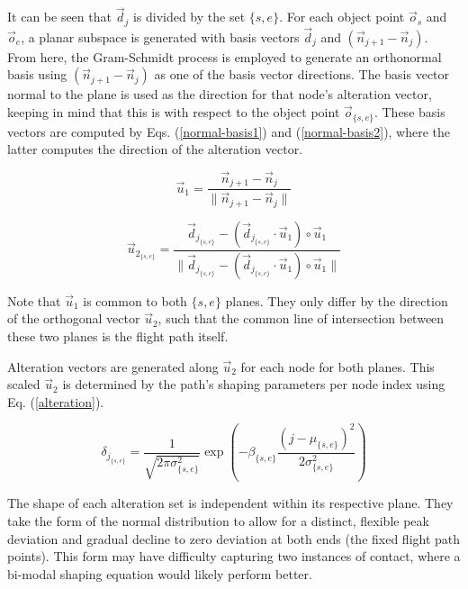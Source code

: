 \documentclass[conf]{new-aiaa}
\begin{document}
It can be seen that $\vec{d}_j$ is divided by the set $\{s, e\}$. For each object point $\vec{o}_s$ and $\vec{o}_e$, a planar subspace is generated with basis vectors $\vec{d}_j$ and $(\vec{n}_{j + 1} - \vec{n}_j)$. From here, the Gram-Schmidt process is employed to generate an orthonormal basis using $(\vec{n}_{j + 1} - \vec{n}_j)$ as one of the basis vector directions. The basis vector normal to the plane is used as the direction for that node's alteration vector, keeping in mind that this is with respect to the object point $\vec{o}_{\{s, e\}}$. These basis vectors are computed by Eqs. (\ref{normal-basis1}) and (\ref{normal-basis2}), where the latter computes the direction of the alteration vector.

\begin{equation}
\label{normal-basis1}
\vec{u}_1 = \frac{\vec{n}_{j + 1} - \vec{n}_j}{\|\vec{n}_{j + 1} - \vec{n}_j\|}
\end{equation}

\begin{equation}
\label{normal-basis2}
\vec{u}_{2_{\{s, e\}}} = \frac{\vec{d}_{j_{\{s, e\}}} - \left(\vec{d}_{j_{\{s, e\}}}{\cdot}\vec{u}_1\right){\circ}\vec{u}_1}{\|\vec{d}_{j_{\{s, e\}}} - \left(\vec{d}_{j_{\{s, e\}}}{\cdot}\vec{u}_1\right){\circ}\vec{u}_1\|}
\end{equation}

Note that $\vec{u}_1$ is common to both $\{s, e\}$ planes. They only differ by the direction of the orthogonal vector $\vec{u}_2$, such that the common line of intersection between these two planes is the flight path itself.

Alteration vectors are generated along $\vec{u}_2$ for each node for both planes. This scaled $\vec{u}_2$ is determined by the path's shaping parameters per node index using Eq. (\ref{alteration}).

\begin{equation}
\label{alteration}
\delta_{j_{\{s, e\}}} = \frac{1}{\sqrt{2\pi\sigma_{\{s, e\}}^2}}\exp\left({-\beta_{\{s, e\}}\frac{{\left(j - \mu_{\{s, e\}}\right)}^2}{2\sigma_{\{s, e\}}^2}}\right)
\end{equation}

The shape of each alteration set is independent within its respective plane. They take the form of the normal distribution to allow for a distinct, flexible peak deviation and gradual decline to zero deviation at both ends (the fixed flight path points). This form may have difficulty capturing two instances of contact, where a bi-modal shaping equation would likely perform better.
\end{document}
